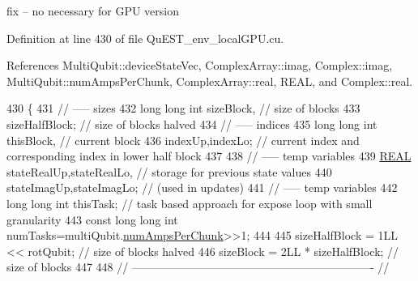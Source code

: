 fix -- no necessary for G\+PU version 

Definition at line 430 of file Qu\+E\+S\+T\+\_\+env\+\_\+local\+G\+P\+U.\+cu.



References Multi\+Qubit\+::device\+State\+Vec, Complex\+Array\+::imag, Complex\+::imag, Multi\+Qubit\+::num\+Amps\+Per\+Chunk, Complex\+Array\+::real, R\+E\+AL, and Complex\+::real.


\begin{DoxyCode}
430                                                                                                            
        \{
431     \textcolor{comment}{// ----- sizes}
432     \textcolor{keywordtype}{long} \textcolor{keywordtype}{long} \textcolor{keywordtype}{int} sizeBlock,                                           \textcolor{comment}{// size of blocks}
433          sizeHalfBlock;                                       \textcolor{comment}{// size of blocks halved}
434     \textcolor{comment}{// ----- indices}
435     \textcolor{keywordtype}{long} \textcolor{keywordtype}{long} \textcolor{keywordtype}{int} thisBlock,                                           \textcolor{comment}{// current block}
436          indexUp,indexLo;                                     \textcolor{comment}{// current index and corresponding index in
       lower half block}
437 
438     \textcolor{comment}{// ----- temp variables}
439     \mbox{\hyperlink{QuEST__precision_8h_a4b654506f18b8bfd61ad2a29a7e38c25}{REAL}}   stateRealUp,stateRealLo,                             \textcolor{comment}{// storage for previous state values}
440            stateImagUp,stateImagLo;                             \textcolor{comment}{// (used in updates)}
441     \textcolor{comment}{// ----- temp variables}
442     \textcolor{keywordtype}{long} \textcolor{keywordtype}{long} \textcolor{keywordtype}{int} thisTask;                                   \textcolor{comment}{// task based approach for expose loop with
       small granularity}
443     \textcolor{keyword}{const} \textcolor{keywordtype}{long} \textcolor{keywordtype}{long} \textcolor{keywordtype}{int} numTasks=multiQubit.\mbox{\hyperlink{structMultiQubit_a1cad83601a78635dd278259c7ed54f18}{numAmpsPerChunk}}>>1;
444 
445     sizeHalfBlock = 1LL << rotQubit;                               \textcolor{comment}{// size of blocks halved}
446     sizeBlock     = 2LL * sizeHalfBlock;                           \textcolor{comment}{// size of blocks}
447 
448     \textcolor{comment}{// ---------------------------------------------------------------- //}

\end{DoxyCode}
